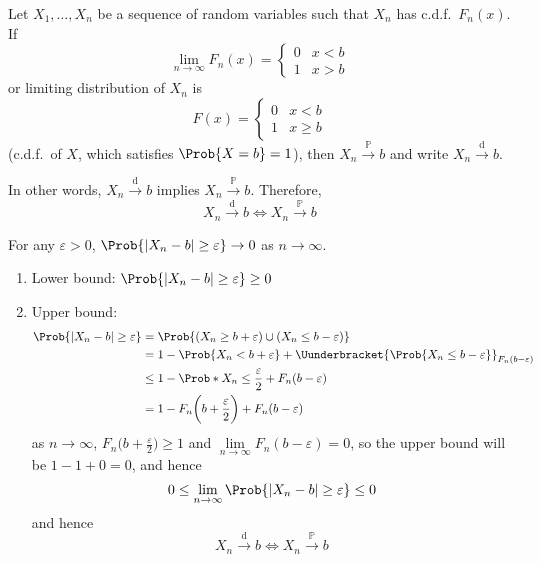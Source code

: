 \begin{Theorem}{}{}
    Let $ X_1,\ldots,X_n $ be a sequence of random variables
    such that $ X_n $ has c.d.f.\ $ F_n(x) $. If
    \[ \lim\limits_{{n} \to {\infty}} F_n(x)=\begin{cases}
            0 & x<b \\
            1 & x>b
        \end{cases} \]
    or limiting distribution of $ X_n $ is
    \[ F(x)=\begin{cases}
            0 & x<b    \\
            1 & x\ge b
        \end{cases} \]
    (c.d.f.\ of $ X $, which satisfies $ \Prob{X=b}=1 $), then
    $ X_n\stackrel{\mathbb{P}}{\to}b $ and write
    $ X_n\stackrel{\text{d}}{\to}b $.

    In other words, $ X_n\stackrel{\text{d}}{\to}b $ implies
    $ X_n\stackrel{\mathbb{P}}{\to}b $. Therefore,
    \[ X_n\stackrel{\text{d}}{\to}b\iff X_n\stackrel{\mathbb{P}}{\to}b \]
\end{Theorem}
\begin{Proof}{}{}
    For any $ \varepsilon>0 $, $ \Prob{\abs{X_n-b}\ge \varepsilon}\to 0 $
    as $ n\to\infty $.
    \begin{enumerate}[label=(\roman*)]
        \item Lower bound: $ \Prob{\abs{X_n-b}\ge \varepsilon}\ge 0 $
        \item Upper bound:
              \begin{align*}
                  \Prob{\abs{X_n-b}\ge \varepsilon}
                   & =\Prob{(X_n\ge b+\varepsilon)\cup (X_n\le b-\varepsilon)}      \\
                   & =1-\Prob{X_n<b+\varepsilon}+
                  \Uunderbracket{\Prob{X_n\le b-\varepsilon}}_{F_n(b-\varepsilon)}  \\
                   & \le 1-\Prob*{X_n\le \frac{\varepsilon}{2}}+F_n(b-\varepsilon)  \\
                   & =1-F_n\biggl(b+\frac{\varepsilon}{2}\biggr)+F_n(b-\varepsilon)
              \end{align*}
              as $ n\to\infty $, $ F_n\biggl(b+\frac{\varepsilon}{2}\biggr)\ge 1 $
              and $ \lim\limits_{{n} \to {\infty}} F_n(b-\varepsilon)=0 $,
              so the upper bound will be $ 1-1+0=0 $, and hence
              \[ 0\le \lim\limits_{{n} \to {\infty}} \Prob{\abs{X_n-b}\ge \varepsilon}
                  \le 0 \]
              and hence
              \[ X_n\stackrel{\text{d}}{\to}b\iff X_n\stackrel{\mathbb{P}}{\to}b \]
    \end{enumerate}
\end{Proof}

